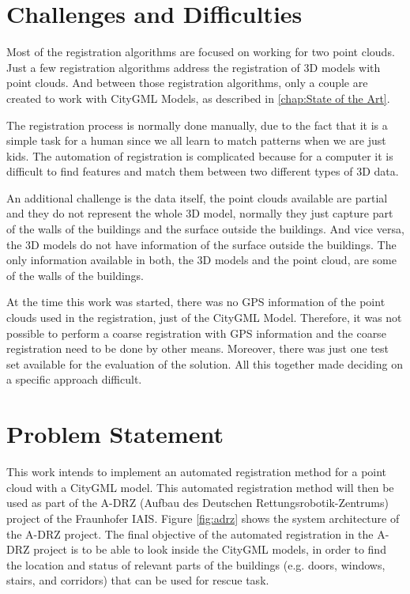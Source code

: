     \section{Challenges and Difficulties}
    
        Most of the registration algorithms are focused on working for two point clouds. 
        Just a few registration algorithms address the registration of 3D models with point clouds.
        And between those registration algorithms, only a couple are created to work with CityGML Models, as described in \autoref{chap:State of the Art}.
        \par      
        The registration process is normally done manually, due to the fact that it is a simple task for a human since we all learn to match patterns when we are just kids. 
        The automation of registration is complicated because for a computer it is difficult to find features and match them between two different types of 3D data.
        \par
        An additional challenge is the data itself, the point clouds available are partial and they do not represent the whole 3D model, 
        normally they just capture part of the walls of the buildings and the surface outside the buildings.
        And vice versa, the 3D models do not have information of the surface outside the buildings.
        The only information available in both, the 3D models and the point cloud, are some of the walls of the buildings.
        \par
        At the time this work was started, there was no GPS information of the point clouds used in the registration, just of the CityGML Model. 
        Therefore, it was not possible to perform a coarse registration with GPS information and the coarse registration need to be done by other means.
        Moreover, there was just one test set available for the evaluation of the solution.
        All this together made deciding on a specific approach difficult.
        \par

    \section{Problem Statement}
        This work intends to implement an automated registration method for a point cloud with a CityGML model.
        This automated registration method will then be used as part of the A-DRZ (Aufbau des Deutschen Rettungsrobotik-Zentrums) project of the Fraunhofer IAIS.
        Figure \ref{fig:adrz} shows the system architecture of the A-DRZ project. 
        The final objective of the automated registration in the A-DRZ project is to be able to look inside the CityGML models, in order to 
        find the location and status of relevant parts of the buildings (e.g. doors, windows, stairs, and corridors) that can be used for rescue task.

